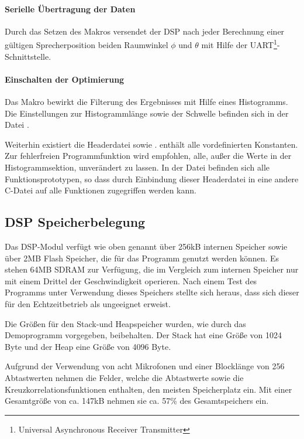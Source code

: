 \paragraph{Serielle Übertragung der Daten} Durch das Setzen des Makros  versendet der DSP nach jeder Berechnung einer gültigen Sprecherposition beiden Raumwinkel $\phi$ und $\theta$ mit Hilfe der UART\footnote{Universal Asynchronous Receiver Transmitter}-Schnittstelle.


\paragraph{Einschalten der Optimierung} Das Makro  bewirkt die Filterung des Ergebnisses mit Hilfe eines Histogramms. Die Einstellungen zur Histogrammlänge sowie der Schwelle befinden sich in der Datei .\newline

Weiterhin existiert die Headerdatei  sowie .  enthält alle vordefinierten Konstanten. Zur fehlerfreien Programmfunktion wird empfohlen, alle, außer die Werte in der Histogrammsektion, unverändert zu lassen. In der Datei  befinden sich alle Funktionsprototypen, so dass durch Einbindung dieser Headerdatei in eine andere C-Datei auf alle Funktionen zugegriffen werden kann.

\subsection{DSP Speicherbelegung}
\label{subsec:DSPSpeicherbelegung}
Das DSP-Modul verfügt wie oben genannt über 256kB internen Speicher sowie über 2MB Flash Speicher, die für das Programm genutzt werden können. Es stehen 64MB SDRAM zur Verfügung, die im Vergleich zum internen Speicher nur mit einem Drittel der Geschwindigkeit operieren. Nach einem Test des Programms unter Verwendung dieses Speichers stellte sich heraus, dass sich dieser für den Echtzeitbetrieb als ungeeignet erweist.

Die Größen für den Stack-und Heapspeicher wurden, wie durch das Demoprogramm vorgegeben, beibehalten. Der Stack hat eine Größe von 1024 Byte und der Heap eine Größe von 4096 Byte.

Aufgrund der Verwendung von acht Mikrofonen und einer Blocklänge von 256 Abtastwerten nehmen die Felder, welche die Abtastwerte sowie die Kreuzkorrelationsfunktionen enthalten, den meisten Speicherplatz ein. Mit einer Gesamtgröße von ca. 147kB nehmen sie ca. 57\% des Gesamtspeichers ein.

